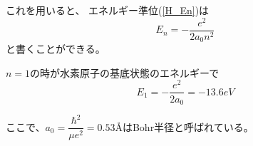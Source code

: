 \documentclass[a4paper,16pt]{jsarticle}
\begin{document}
これを用いると、
エネルギー準位(\ref{H_En})は
\begin{equation}
	E_n = -\dfrac{e^2}{2a_0n^2}
\end{equation}
と書くことができる。

$n = 1$の時が水素原子の基底状態のエネルギーで
\begin{equation}
	E_1 = -\dfrac{e^2}{2a_0} = -13.6 \si{eV}
\end{equation}

ここで、$a_0 = \dfrac{\hbar^2}{\mu e^2} = 0.53 \text{\AA}$はBohr半径と呼ばれている。


\end{document}
